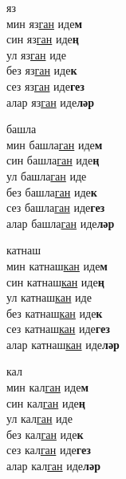 \begin{multicols}{4}
\begin{enumerate}
\begin{minipage}{\linewidth}
    \item
    яз\\
    мин яз\underline{ган} иде\textbf{м}\\
    син яз\underline{ган} иде\textbf{ң}\\
    ул яз\underline{ган} иде\\
    без яз\underline{ган} иде\textbf{к}\\
    сез яз\underline{ган} иде\textbf{гез}\\
    алар яз\underline{ган} иде\textbf{ләр}\\
\end{minipage}

\begin{minipage}{\linewidth}
    \item
    башла\\
    мин башла\underline{ган} иде\textbf{м}\\
    син башла\underline{ган} иде\textbf{ң}\\
    ул башла\underline{ган} иде\\
    без башла\underline{ган} иде\textbf{к}\\
    сез башла\underline{ган} иде\textbf{гез}\\
    алар башла\underline{ган} иде\textbf{ләр}\\
\end{minipage}

\begin{minipage}{\linewidth}
    \item
    катнаш\\
    мин катнаш\underline{кан} иде\textbf{м}\\
    син катнаш\underline{кан} иде\textbf{ң}\\
    ул катнаш\underline{кан} иде\\
    без катнаш\underline{кан} иде\textbf{к}\\
    сез катнаш\underline{кан} иде\textbf{гез}\\
    алар катнаш\underline{кан} иде\textbf{ләр}\\
\end{minipage}

\begin{minipage}{\linewidth}
    \item
    кал\\
    мин кал\underline{ган} иде\textbf{м}\\
    син кал\underline{ган} иде\textbf{ң}\\
    ул кал\underline{ган} иде\\
    без кал\underline{ган} иде\textbf{к}\\
    сез кал\underline{ган} иде\textbf{гез}\\
    алар кал\underline{ган} иде\textbf{ләр}\\
\end{minipage}


\end{enumerate}
\end{multicols}
